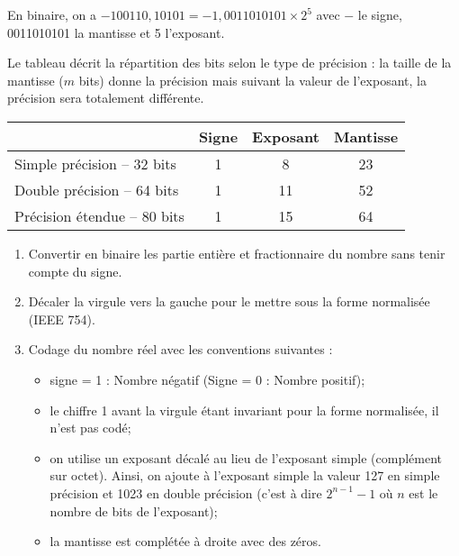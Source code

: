 \begin{exemple}
En binaire, on a $-100110,10101 =  -1,0011010101\times 2^5$ avec $-$ le signe, 0011010101 la mantisse et 5 l'exposant.
\end{exemple}

\begin{minipage}[c]{.4\linewidth}
Le tableau décrit la répartition des bits selon le type de précision : la taille de la mantisse ($m$ bits) donne la précision mais suivant la valeur de l'exposant, la précision sera totalement différente. 

%


\end{minipage}\hfill
\begin{minipage}[c]{.59\linewidth}
\begin{center}
\begin{tabular}{| l |c|c|c|}
\hline

& Signe & Exposant & Mantisse \\ \hline
 Simple précision -- 32 bits & 1 & 8 & 23 \\ \hline
 Double précision -- 64 bits & 1 & 11 & 52 \\ \hline
 Précision étendue -- 80 bits & 1 & 15 & 64 \\ \hline
\end{tabular}
\end{center}
\end{minipage}


\begin{methode}
\begin{enumerate}
\item Convertir en binaire les partie entière et fractionnaire du nombre sans tenir compte du signe.
\item Décaler la virgule vers la gauche pour le mettre sous la forme normalisée (IEEE 754).
\item Codage du nombre réel avec les conventions suivantes : 
\begin{itemize}
\item signe = 1 : Nombre négatif 	(Signe = 0 : Nombre positif);
\item le chiffre 1 avant la virgule étant invariant pour la forme normalisée, il n’est pas codé;
\item on utilise un exposant décalé au lieu de l’exposant simple (complément sur octet). Ainsi, on ajoute à l’exposant simple la valeur 127 en simple précision et 1023 en double précision (c’est à dire $2^{n-1}-1$ où $n$ est le nombre de bits de l’exposant);
\item la mantisse est complétée à droite avec des zéros.
\end{itemize}
\end{enumerate}
\end{methode}


